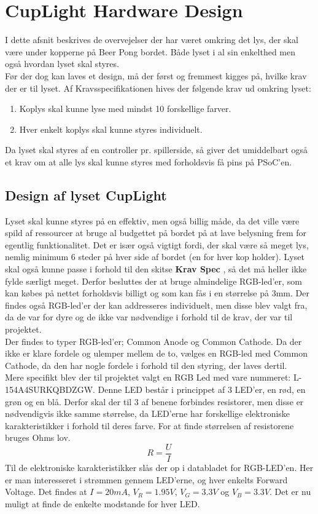 \documentclass[HardwareDesign/HardwareDesign_main.tex]{subfiles}
\begin{document}
\section{CupLight Hardware Design}\label{sec:cuplight_hw_design}
I dette afsnit beskrives de overvejelser der har været omkring det lys, der skal være under kopperne på Beer Pong bordet. Både lyset i al sin enkelthed men også hvordan lyset skal styres.\\
Før der dog kan laves et design, må der først og fremmest kigges på, hvilke krav der er til lyset. Af Kravsspecifikationen  hives der følgende krav ud omkring lyset:
\begin{enumerate}
    \item Koplys skal kunne lyse med mindst 10 forskellige farver.
    \item Hver enkelt koplys skal kunne styres individuelt.
\end{enumerate}
Da lyset skal styres af en controller pr. spillerside, så giver det umiddelbart også et krav om at alle lys skal kunne styres med forholdsvis få pins på PSoC'en. 
\subsection{Design af lyset CupLight}
Lyset skal kunne styres på en effektiv, men også billig måde, da det ville være spild af ressourcer at bruge al budgettet på bordet på at lave belysning frem for egentlig funktionalitet. Det er især også vigtigt fordi, der skal være så meget lys, nemlig minimum 6 steder på hver side af bordet (en for hver kop holder). Lyset skal også kunne passe i forhold til den skitse \textbf{Krav Spec} , så det må heller ikke fylde særligt meget. Derfor besluttes der at bruge almindelige RGB-led'er, som kan købes på nettet forholdsvis billigt og som kan fås i en størrelse på 3mm. Der findes også RGB-led'er der kan addresseres individuelt, men disse blev valgt fra, da de var for dyre og de ikke var nødvendige i forhold til de krav, der var til projektet. 
\\Der findes to typer RGB-led'er; Common Anode og Common Cathode. Da der ikke er klare fordele og ulemper mellem de to, vælges en RGB-led med Common Cathode, da den har nogle fordele i forhold til den styring, der laves dertil. 
\\Mere specifikt blev der til projektet valgt en RGB Led med vare nummeret: \textsc{L-154A4SURKQBDZGW}\cite{Dimensions2015RGB_Led_Datasheet}. Denne LED består i princippet af 3 LED'er, en rød, en grøn og en blå. Derfor skal der til 3 af benene forbindes resistorer, men disse er nødvendigvis ikke samme størrelse, da LED'erne har forskellige elektroniske karakteristikker i forhold til deres farve. For at finde størrelsen af resistorene bruges Ohms lov.
\begin{equation}
    R=\frac{U}{I}
\end{equation}
Til de elektroniske karakteristikker slås der op i databladet for RGB-LED'en. Her er man interesseret i strømmen gennem LED'erne, og hver enkelts Forward Voltage. Det findes at $I=20mA$, $V_R=1.95V$, $V_G=3.3V$ og $V_B=3.3V$. Det er nu muligt at finde de enkelte modstande for hver LED.
\end{document}

